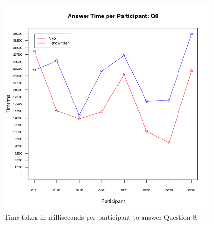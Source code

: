 \documentclass[12pt,twoside,notitlepage,xetex]{report}
\begin{document}
\begin{center}
\begin{figure}[H]
\begin{center}
\includegraphics[height=\textheight/2-2cm]{figs/graphs/q8.png}
\end{center}
\caption{Time taken in milliseconds per participant to answer Question 8.}
\end{figure}
\end{center}
\end{document}
